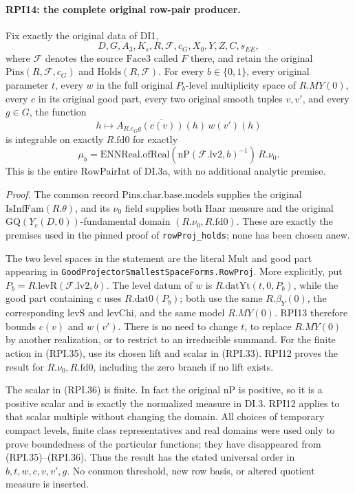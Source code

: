 \paragraph{RPI14: the complete original row-pair producer.}
\label{claim:RPI14}
Fix exactly the original data of DI1,
\[
          D,G,A_3,K_s,R,\mathscr F,c_G,X_0,Y,Z,C,s_{EE},
 \tag{RPI.34}
\]
where \(\mathscr F\) denotes the source \(\mathrm{Face3}\)
called \(F\) there, and retain the original
\(\mathrm{Pins}(R,\mathscr F,c_G)\) and
\(\mathrm{Holds}(R,\mathscr F)\).
For every \(b\in\{0,1\}\), every original parameter \(t\),
every \(w\) in the full original \(P_b\)-level
multiplicity space of \(R.MY(0)\), every \(c\) in its
original good part, every two original smooth tuples
\(v,v'\), and every \(g\in G\), the function
\[
 h\longmapsto
       \overline{A_{R.e_Gg}(c(v))(h)}\,w(v')(h)
 \tag{RPI.35}
\]
is integrable on exactly \(R.\mathrm{fd0}\) for exactly
\[
 \mu_b=
 \mathrm{ENNReal.ofReal}\!\left(
                 \mathrm{nP}(\mathscr F.\mathrm{lv2},b)^{-1}
                            \right)\,R.\nu_0.
 \tag{RPI.36}
\]
This is the entire \(\mathrm{RowPairInt}\) of DI.3a,
with no additional analytic premise.

\emph{Proof.}
The common record
\(\mathrm{Pins.char.base.models}\) supplies the original
\(\mathrm{IsInfFam}(R.\theta)\), and its \(\nu_0\) field
supplies both Haar measure and the original
\(\mathrm{GQ}(Y_c(D,0))\)-fundamental domain
\((R.\nu_0,R.\mathrm{fd0})\).
These are exactly the premises used in the pinned proof
of \texttt{rowProj\_holds}; none has been chosen anew.

The two level spaces in the statement are the literal
\(\mathrm{Mult}\) and good part appearing in
\texttt{Good\allowbreak Projector\allowbreak Smallest\allowbreak Space\allowbreak Forms.\allowbreak RowProj}.
More explicitly, put \(P_b=R.\mathrm{levR}(\mathscr F.\mathrm{lv2},b)\).
The level datum of \(w\) is
\(R.\mathrm{datYt}(t,0,P_b)\), while the good part containing
\(c\) uses \(R.\mathrm{dat0}(P_b)\); both use the same
\(R.\beta_Y(0)\), the corresponding \(\mathrm{levS}\) and
\(\mathrm{levChi}\), and the same model \(R.MY(0)\).
RPI13 therefore bounds \(c(v)\) and \(w(v')\).
There is no need to change \(t\), to replace \(R.MY(0)\)
by another realization, or to restrict to an irreducible
summand.  For the finite action in (RPI.35), use its
chosen lift and scalar in (RPI.33).  RPI12 proves the
result for \(R.\nu_0,R.\mathrm{fd0}\), including the
zero branch if no lift exists.

The scalar in (RPI.36) is finite.  In fact the original
\(\mathrm{nP}\) is positive, so it is a positive scalar
and is exactly the normalized measure in DI.3.
RPI12 applies to that scalar multiple without changing
the domain.  All choices of temporary compact levels,
finite class representatives and real domains were used
only to prove boundedness of the particular functions;
they have disappeared from (RPI.35)--(RPI.36).
Thus the result has the stated universal order in
\(b,t,w,c,v,v',g\).  No common threshold, new row basis,
or altered quotient measure is inserted.

